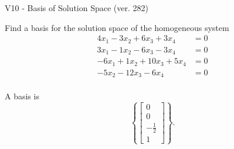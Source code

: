 \begin{exercise}
  \begin{exerciseTitle}V10 - Basis of Solution Space (ver. 282)\end{exerciseTitle}
  \begin{exerciseStatement}
    Find a basis for the solution space of the homogeneous system 
\begin{align*}
 4 x_ 1 -3 x_ 2 + 6 x_ 3 + 3 x_ 4 &= 0  \\ 
  3 x_ 1 -1 x_ 2 -6 x_ 3 -3 x_ 4 &= 0  \\ 
  -6 x_ 1 + 1 x_ 2 + 10 x_ 3 + 5 x_ 4 &= 0  \\ 
  -5 x_ 2 -12 x_ 3 -6 x_ 4 &= 0  \\ 
 \end{align*}


 
  \end{exerciseStatement}

  \begin{exerciseAnswer}
   A basis is   
\[\left\{\left[\begin{array}{c}
0 \\
0 \\
-\frac{1}{2} \\
1
\end{array}\right]\right\}.\]

  


  \end{exerciseAnswer}
\end{exercise}